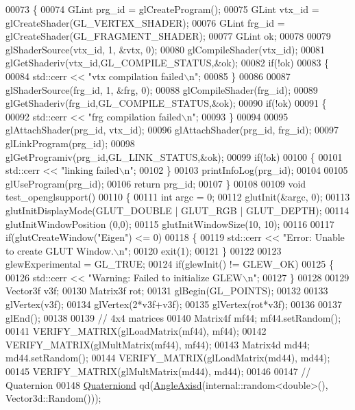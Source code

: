 \begin{DoxyCode}
00073 \{
00074   GLint prg\_id = glCreateProgram();
00075   GLint vtx\_id = glCreateShader(GL\_VERTEX\_SHADER);
00076   GLint frg\_id = glCreateShader(GL\_FRAGMENT\_SHADER);
00077   GLint ok;
00078   
00079   glShaderSource(vtx\_id, 1, &vtx, 0);
00080   glCompileShader(vtx\_id);
00081   glGetShaderiv(vtx\_id,GL\_COMPILE\_STATUS,&ok);
00082   \textcolor{keywordflow}{if}(!ok)
00083   \{
00084     std::cerr << \textcolor{stringliteral}{"vtx compilation failed\(\backslash\)n"};
00085   \}
00086   
00087   glShaderSource(frg\_id, 1, &frg, 0);
00088   glCompileShader(frg\_id);
00089   glGetShaderiv(frg\_id,GL\_COMPILE\_STATUS,&ok);
00090   \textcolor{keywordflow}{if}(!ok)
00091   \{
00092     std::cerr << \textcolor{stringliteral}{"frg compilation failed\(\backslash\)n"};
00093   \}
00094   
00095   glAttachShader(prg\_id, vtx\_id);
00096   glAttachShader(prg\_id, frg\_id);
00097   glLinkProgram(prg\_id);
00098   glGetProgramiv(prg\_id,GL\_LINK\_STATUS,&ok);
00099   \textcolor{keywordflow}{if}(!ok)
00100   \{
00101     std::cerr << \textcolor{stringliteral}{"linking failed\(\backslash\)n"};
00102   \}
00103   printInfoLog(prg\_id);
00104   
00105   glUseProgram(prg\_id);
00106   \textcolor{keywordflow}{return} prg\_id;
00107 \}
00108 
00109 \textcolor{keywordtype}{void} test\_openglsupport()
00110 \{
00111   \textcolor{keywordtype}{int} argc = 0;
00112   glutInit(&argc, 0);
00113   glutInitDisplayMode(GLUT\_DOUBLE | GLUT\_RGB | GLUT\_DEPTH);
00114   glutInitWindowPosition (0,0);
00115   glutInitWindowSize(10, 10);
00116 
00117   \textcolor{keywordflow}{if}(glutCreateWindow(\textcolor{stringliteral}{"Eigen"}) <= 0)
00118   \{
00119     std::cerr << \textcolor{stringliteral}{"Error: Unable to create GLUT Window.\(\backslash\)n"};
00120     exit(1);
00121   \}
00122   
00123   glewExperimental = GL\_TRUE;
00124   \textcolor{keywordflow}{if}(glewInit() != GLEW\_OK)
00125   \{
00126     std::cerr << \textcolor{stringliteral}{"Warning: Failed to initialize GLEW\(\backslash\)n"};
00127   \}
00128 
00129   Vector3f v3f;
00130   Matrix3f rot;
00131   glBegin(GL\_POINTS);
00132   
00133   glVertex(v3f);
00134   glVertex(2*v3f+v3f);
00135   glVertex(rot*v3f);
00136   
00137   glEnd();
00138   
00139   \textcolor{comment}{// 4x4 matrices}
00140   Matrix4f mf44; mf44.setRandom();
00141   VERIFY\_MATRIX(glLoadMatrix(mf44), mf44);
00142   VERIFY\_MATRIX(glMultMatrix(mf44), mf44);
00143   Matrix4d md44; md44.setRandom();
00144   VERIFY\_MATRIX(glLoadMatrix(md44), md44);
00145   VERIFY\_MATRIX(glMultMatrix(md44), md44);
00146   
00147   \textcolor{comment}{// Quaternion}
00148   \hyperlink{group___geometry___module_class_eigen_1_1_quaternion}{Quaterniond} qd(\hyperlink{group___geometry___module_gac218cd8f23b49aa36401d0c843bb6835}{AngleAxisd}(internal::random<double>(), Vector3d::Random()));

\end{DoxyCode}
